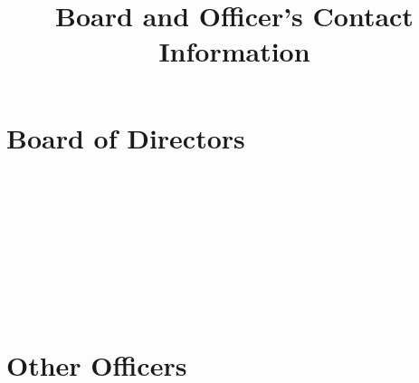 


\title{Board and Officer's Contact Information}

\maketitle

\section{Board of Directors}


\address{Richard Lodge\\
Director, President\\
}

\address{Roger Button\\
Director, Corporate Secretary, NStar Chronicle Editor}\\

\address{Bill Tate\\
Director, Special Events}\\

\address{Phil Chrysler\\
Director, Merchandise}\\

\address{Garry Dupont\\
Director}\\

\address{Neil Raynor\\
Director}\\





\columnbreak  

\vspace{12pt}

\section{Other Officers}

\address{Bruce Gemmill\\
Membership Secretary\\
}

